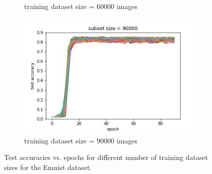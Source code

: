 \documentclass{article} %
\begin{document}
\begin{figure}
\begin{subfigure}{.5\textwidth}
        \caption{training dataset size = $60000$ images}
        \label{fig:subsetsize30000}
    \end{subfigure}%
    \begin{subfigure}{.5\textwidth}
        \centering
        \includegraphics[width=.8\linewidth]{emnist/test_acc_vs_epoch_subset_size_90000.jpg}
        \caption{training dataset size = $90000$ images}
        \label{fig:subsetsize45000}
    \end{subfigure}

    \caption{Test accuracies vs. epochs for different number of training dataset sizes for the Emnist dataset.}
    \label{fig:emnist_accuracy_vs_epoch_by_subset_size}
\end{figure}
\end{document}
